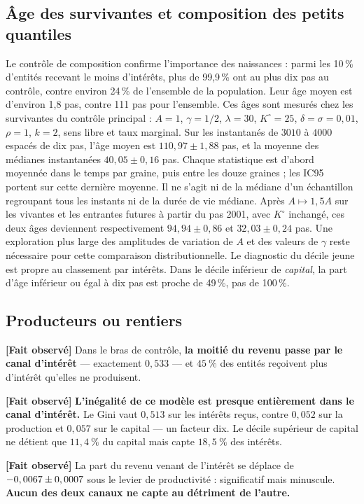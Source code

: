 \documentclass[11pt,a4paper]{article}
\newcommand{\fait}{\textbf{[Fait observé]}}
\begin{document}
\subsection{Âge des survivantes et composition des petits quantiles}
Le contrôle de composition confirme l'importance des naissances : parmi
les 10\,\% d'entités recevant le moins d'intérêts, plus de 99,9\,\%
ont au plus dix pas au contrôle, contre environ 24\,\% de l'ensemble
de la population. Leur âge moyen est d'environ 1,8 pas, contre 111 pas
pour l'ensemble. Ces âges sont mesurés chez les survivantes du contrôle
principal : $A=1$, $\gamma=1/2$, $\lambda=30$, $K^\circ=25$,
$\delta=\sigma=0{,}01$, $\rho=1$, $k=2$, sens libre et taux marginal.
Sur les instantanés de $3010$ à $4000$ espacés de dix pas, l'âge
moyen est $110{,}97\pm1{,}88$ pas, et la moyenne des médianes
instantanées $40{,}05\pm0{,}16$ pas. Chaque statistique est d'abord
moyennée dans le temps par graine, puis entre les douze graines ;
les IC95 portent sur cette dernière moyenne. Il ne s'agit ni de la
médiane d'un échantillon regroupant tous les instants ni de la durée
de vie médiane. Après $A\mapsto1{,}5A$ sur les vivantes et les
entrantes futures à partir du pas 2001, avec $K^\circ$ inchangé,
ces deux âges deviennent respectivement $94{,}94\pm0{,}86$ et
$32{,}03\pm0{,}24$ pas. Une exploration plus large des amplitudes
de variation de $A$ et des valeurs de $\gamma$ reste nécessaire
pour cette comparaison distributionnelle.
Le diagnostic du décile jeune est propre au classement par intérêts.
Dans le décile inférieur de \emph{capital}, la part d'âge inférieur
ou égal à dix pas est proche de 49\,\%, pas de 100\,\%.


\subsection{Producteurs ou rentiers}

\fait{} Dans le bras de contrôle, \textbf{la moitié du revenu passe par le
canal d'intérêt} --- exactement $0{,}533$ --- et $45~\%$ des entités reçoivent
plus d'intérêt qu'elles ne produisent.

\fait{} \textbf{L'inégalité de ce modèle est presque entièrement dans le canal
d'intérêt.} Le Gini vaut $0{,}513$ sur les intérêts reçus, contre $0{,}052$ sur
la production et $0{,}057$ sur le capital --- un facteur dix. Le décile
supérieur de capital ne détient que $11{,}4~\%$ du capital mais capte
$18{,}5~\%$ des intérêts.

\fait{} La part du revenu venant de l'intérêt se déplace de
$-0,0067 \pm 0,0007$ sous le levier de
productivité : significatif mais minuscule. \textbf{Aucun des deux canaux ne
capte au détriment de l'autre.}
\end{document}
